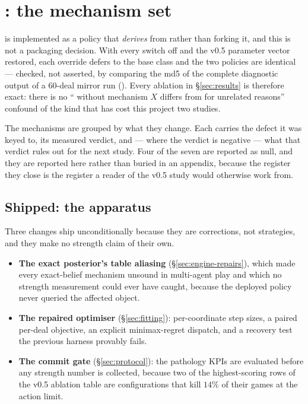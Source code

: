 \section{\vsix{}: the mechanism set}
\label{sec:mechanisms}

\vsix{} is implemented as a policy that \emph{derives} from \vfive{} rather than forking it, and
this is not a packaging decision. With every \vsix{} switch off and the v0.5 parameter vector
restored, each override defers to the base class and the two policies are identical --- checked, not
asserted, by comparing the md5 of the complete diagnostic output of a $60$-deal mirror run
(\vsixIdentity{}). Every ablation in \S\ref{sec:results} is therefore exact: there is no
``\vsix{} without mechanism $X$ differs from \vfive{} for unrelated reasons'' confound of the kind
that has cost this project two studies.

The mechanisms are grouped by what they change. Each carries the defect it was keyed to, its
measured verdict, and --- where the verdict is negative --- what that verdict rules out for the next
study. Four of the seven are reported as null, and they are reported here rather than buried in an
appendix, because the register they close is the register a reader of the v0.5 study would otherwise
work from.

\subsection{Shipped: the apparatus}
\label{sec:mech-cheap}

Three changes ship unconditionally because they are corrections, not strategies, and they make no
strength claim of their own.

\begin{itemize}
\item \textbf{The exact posterior's table aliasing} (\S\ref{sec:engine-repairs}), which made every
  exact-belief mechanism unsound in multi-agent play and which no strength measurement could ever
  have caught, because the deployed policy never queried the affected object.
\item \textbf{The repaired optimiser} (\S\ref{sec:fitting}): per-coordinate step sizes, a paired
  per-deal objective, an explicit minimax-regret dispatch, and a recovery test the previous harness
  provably fails.
\item \textbf{The commit gate} (\S\ref{sec:protocol}): the pathology KPIs are evaluated before any
  strength number is collected, because two of the highest-scoring rows of the v0.5 ablation table
  are configurations that kill $14\%$ of their games at the action limit.
\end{itemize}

